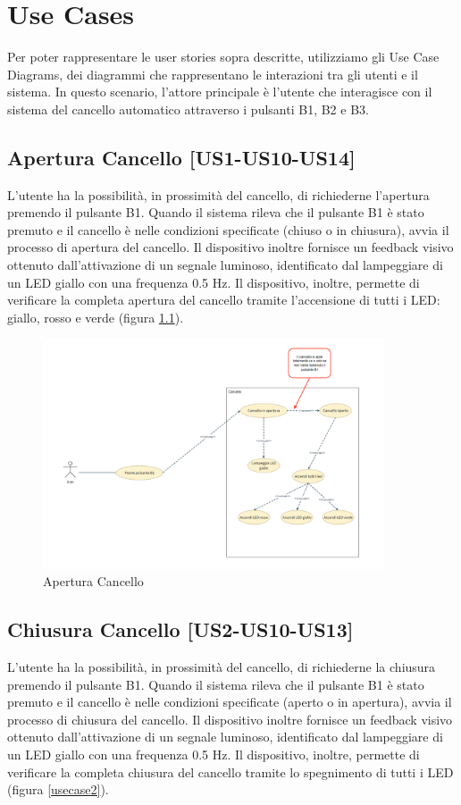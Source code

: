 \chapter{\bf{Use Cases}}
\noindent Per poter rappresentare le user stories sopra descritte, utilizziamo gli Use Case Diagrams, dei diagrammi che rappresentano le interazioni tra gli utenti e il sistema.
In questo scenario, l'attore principale è l'utente che  interagisce con il sistema del cancello automatico attraverso i pulsanti B1, B2 e B3.


\section{Apertura Cancello [US1-US10-US14]}
L'utente ha la possibilità, in prossimità del cancello, di richiederne l'apertura premendo il pulsante B1. Quando il sistema rileva che il pulsante B1 è stato premuto e il cancello è nelle condizioni specificate (chiuso o in chiusura), avvia il processo di apertura del cancello. Il dispositivo inoltre fornisce un feedback visivo ottenuto dall'attivazione di un segnale luminoso, identificato dal lampeggiare di un LED giallo con una frequenza 0.5 Hz.
Il dispositivo, inoltre, permette di verificare la completa apertura del cancello tramite l'accensione di tutti i LED: giallo, rosso e verde (figura \ref{usecase1}).

\begin{figure}
    \centering
    \includegraphics[width=0.9\textwidth]{figures/usecase_1.png}
    \caption{Apertura Cancello}
    \label{usecase1}
\end{figure}


\section{Chiusura Cancello [US2-US10-US13]}
L'utente ha la possibilità, in prossimità del cancello, di richiederne la chiusura premendo il pulsante B1. Quando il sistema rileva che il pulsante B1 è stato premuto e il cancello è nelle condizioni specificate (aperto o in apertura), avvia il processo di chiusura del cancello. Il dispositivo inoltre fornisce un feedback visivo ottenuto dall'attivazione di un segnale luminoso, identificato dal lampeggiare di un LED giallo con una frequenza 0.5 Hz.
Il dispositivo, inoltre, permette di verificare la completa chiusura del cancello tramite lo spegnimento di tutti i LED (figura \ref{usecase2}).

